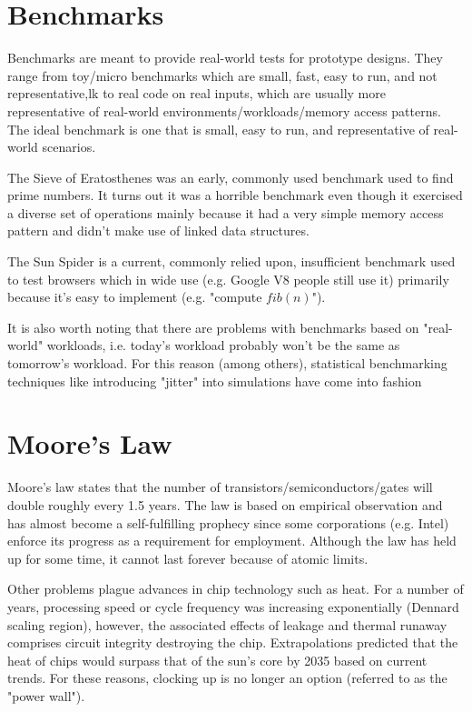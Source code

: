 \documentclass[twoside]{article}
\begin{document}
\section{Benchmarks}
Benchmarks are meant to provide real-world tests for prototype designs.  They range from toy/micro benchmarks which are small, fast, easy to run, and not representative,lk to real code on real inputs, which are usually more representative of real-world environments/workloads/memory access patterns.  The ideal benchmark is one that is small, easy to run, and representative of real-world scenarios.  

The Sieve of Eratosthenes was an early, commonly used benchmark used to find prime numbers.  It turns out it was a horrible benchmark even though it exercised a diverse set of operations mainly because it had a very simple memory access pattern and didn't make use of linked data structures.

The Sun Spider is a current, commonly relied upon, insufficient benchmark used to test browsers which in wide use (e.g. Google V8 people still use it) primarily because it's easy to implement (e.g. "compute $fib(n)$").

It is also worth noting that there are problems with benchmarks based on "real-world" workloads, i.e. today's workload probably won't be the same as tomorrow's workload. For this reason (among others), statistical benchmarking techniques like introducing "jitter" into simulations have come into fashion

\section{Moore's Law}
Moore's law states that the number of transistors/semiconductors/gates will double roughly every 1.5 years.  The law is based on empirical observation and has almost become a self-fulfilling prophecy since some corporations (e.g. Intel) enforce its progress as a requirement for employment.  Although the law has held up for some time, it cannot last forever because of atomic limits.

Other problems plague advances in chip technology such as heat.  For a number of years, processing speed or cycle frequency was increasing exponentially (Dennard scaling region), however, the associated effects of leakage and thermal runaway comprises circuit integrity destroying the chip.  Extrapolations predicted that the heat of chips would surpass that of the sun's core by 2035 based on current trends.  For these reasons, clocking up is no longer an option (referred to as the "power wall").
\end{document}
